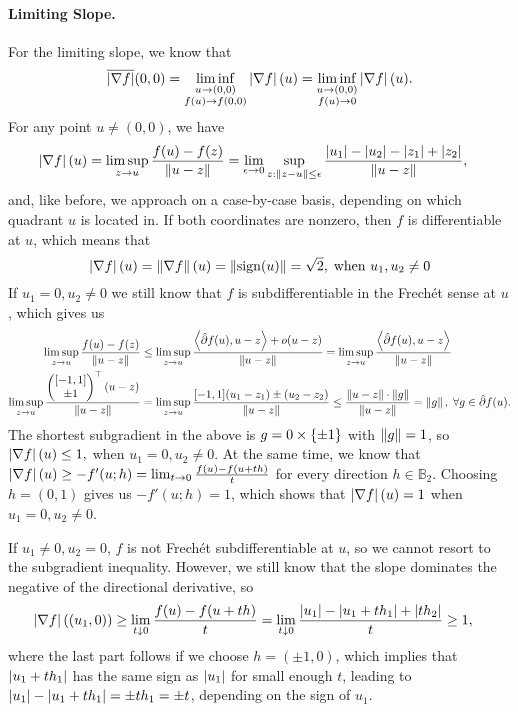\documentclass[10pt]{article}
\newcommand{\regdiff}{\hat{\partial}}
\begin{document}
\paragraph{Limiting Slope.}
For the limiting slope, we know that
\[
    \overline{\left| \nabla f \right|}(0, 0) = \liminf_{\substack{u \to (0, 0) \\ f(u)
    \to f(0, 0)}} \left| \nabla f \right|(u) = \liminf_{\substack{u \to (0, 0) \\ f(u)
    \to 0}} \left| \nabla f \right|(u).
\]
For any point $u \neq (0, 0)$, we have
\begin{align*}
\left| \nabla f \right|(u) &=
\limsup_{z \to u} \frac{f(u) - f(z)}{\left \| u - z \right \|} = \lim_{\epsilon \to 0}
\sup_{z : \left \| z - u \right \| \leq \epsilon}
\frac{\left| u_1 \right| - \left| u_2 \right| - \left| z_1 \right| + \left| z_2 \right|}{\left \| u - z \right \|},
\end{align*}
and, like before, we approach on a case-by-case basis, depending on which
quadrant $u$ is located in. If both coordinates are nonzero, then $f$ is
differentiable at $u$, which means that
\[
    \left| \nabla f \right|(u) = \left \| \nabla f \right \|(u) = \left \| \mathrm{sign}(u) \right \| = \sqrt{2},
    \; \text{when } u_1, u_2 \neq 0
\]
If $u_1 = 0, u_2 \neq 0$ we still know that $f$ is
subdifferentiable in the Frech{\'e}t sense at $u$, which gives us
\begin{align*}
    \limsup_{z \to u} \frac{f(u) - f(z)}{\norm{u - z}} &\leq
    \limsup_{z \to u} \frac{\ip{\regdiff f(u), u - z} + o(u - z)}{\norm{u - z}}
    = \limsup_{z \to u} \frac{\ip{\regdiff f(u), u - z}}{\norm{u - z}} \\
    \limsup_{z \to u} \frac{\pmx{[-1, 1] \\ \pm 1}^\top (u - z)}{\norm{u - z}}
    &= \limsup_{z \to u} \frac{[-1, 1] (u_1 - z_1) \pm (u_2 - z_2)}{\norm{u -
    z}} \leq \frac{\norm{u - z} \cdot \norm{g}}{\norm{u - z}} = \norm{g}, \;
    \forall g \in \regdiff f(u).
\end{align*}
The shortest subgradient in the above is $g = 0 \times \left\{ \pm 1 \right\}$ with
$\left \| g \right \| = 1$, so $\left| \nabla f \right|(u) \leq 1, $ when $u_1 = 0, u_2 \neq 0$. At
the same time, we know that $\left| \nabla f \right|(u) \geq -f'(u; h) = \lim_{t \to 0}
\frac{f(u) - f(u + th)}{t}$ for every direction $h \in \mathbb{B}_2$. Choosing
$h = (0, 1)$ gives us $-f'(u; h) = 1$, which shows that $\left| \nabla f \right|(u) = 1$
when $u_1 = 0, u_2 \neq 0$.

If $u_1 \neq 0, u_2 = 0$, $f$ is not Frech{\'e}t subdifferentiable at $u$, so
we cannot resort to the subgradient inequality. However, we still know that the
slope dominates the negative of the directional derivative, so
\begin{align*}
    \left| \nabla f \right|((u_1, 0)) &\geq \lim_{t \downarrow 0}
    \frac{f(u) - f(u + th)}{t} = \lim_{t \downarrow 0} \frac{\left| u_1 \right| - \left| u_1 +
    th_1 \right| + \left| th_2 \right|}{t} \geq 1,
\end{align*}
where the last part follows if we choose $h = (\pm 1, 0)$, which implies that
$\left| u_1 + th_1 \right|$ has the same sign as $\left| u_1 \right|$ for small enough $t$,
leading to $\left| u_1 \right| - \left| u_1 + th_1 \right| = \pm t h_1 = \pm t$, depending on the
sign of $u_1$.
\end{document}
